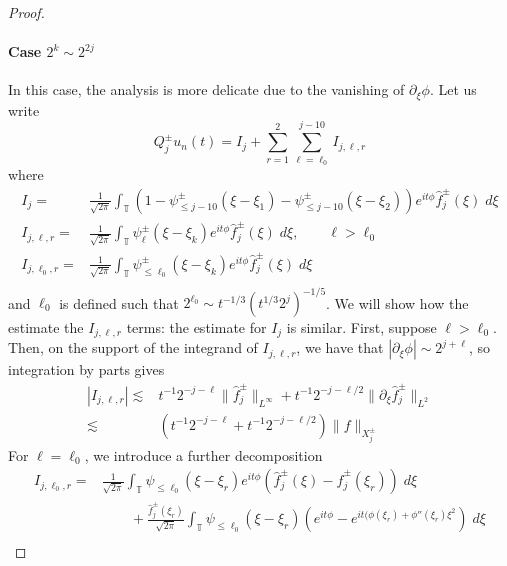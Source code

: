 \documentclass[letterpaper, reqno,final]{amsart}
\newcommand{\bbT}{\mathbb{T}}
\begin{document}
\begin{proof}
   \paragraph{Case $2^k \sim 2^{2j}$} In this case, the analysis is more delicate due to the vanishing of $\partial_\xi \phi$.  Let us write
   \begin{equation}
       Q^\pm_j u_n(t) = I_j + \sum_{r=1}^2\sum_{\ell = \ell_0}^{j-10} I_{j,\ell,r}
   \end{equation}
   where
   \begin{equation*}\begin{split}
       I_j =& \frac{1}{\sqrt{2\pi}} \int_{\bbT} (1 - \psi_{\leq j-10}^\pm(\xi - \xi_1) - \psi_{\leq j-10}^\pm(\xi - \xi_2)) e^{it\phi} \hat{f}^{\pm}_j(\xi)\;d\xi\\
       I_{j,\ell,r} =& \frac{1}{\sqrt{2\pi}} \int_{\bbT} \psi_{\ell}^\pm(\xi - \xi_k) e^{it\phi} \hat{f}^{\pm}_j(\xi)\;d\xi, \qquad \ell > \ell_0\\
       I_{j,\ell_0,r} =& \frac{1}{\sqrt{2\pi}} \int_{\bbT} \psi_{\leq \ell_0}^\pm(\xi - \xi_k) e^{it\phi} \hat{f}^{\pm}_j(\xi)\;d\xi\\
   \end{split}\end{equation*}
   and $\ell_0$ is defined such that $2^{\ell_0} \sim t^{-1/3}(t^{1/3} 2^j)^{-1/5}$.  We will show how the estimate the $I_{j,\ell,r}$ terms: the estimate for $I_j$ is similar.  First, suppose $\ell > \ell_0$.  Then, on the support of the integrand of $I_{j,\ell,r}$, we have that $|\partial_\xi \phi| \sim 2^{j + \ell}$, so integration by parts gives
   \begin{equation*}\begin{split}
       |I_{j,\ell,r}| \lesssim& t^{-1} 2^{-j-\ell} \lVert \hat{f}^\pm_j\rVert_{L^\infty} + t^{-1} 2^{-j - \ell/2} \lVert \partial_\xi \hat{f}^\pm_j \rVert_{L^2}\\
       \lesssim& (t^{-1} 2^{-j-\ell} + t^{-1} 2^{-j - \ell/2}) \lVert f \rVert_{X^\pm_j}
   \end{split}\end{equation*}
   For $\ell = \ell_0$, we introduce a further decomposition
   \begin{equation*}\begin{split}
       I_{j,\ell_0,r} =& \frac{1}{\sqrt{2\pi}} \int_{\bbT} \psi_{\leq \ell_0}(\xi - \xi_r) e^{it\phi} \left(\hat{f}^\pm_j(\xi) - \hat{f}^\pm_j(\xi_r)\right)\;d\xi\\
       &\qquad + \frac{\hat{f}^{\pm}_j(\xi_r)}{\sqrt{2\pi}} \int_{\bbT} \psi_{\leq \ell_0}(\xi - \xi_r) \left(e^{it\phi} - e^{it(\phi(\xi_r) + \phi''(\xi_r) \xi^2}\right)\;d\xi\\

\end{split}
\end{equation*}
\end{proof}
\end{document}
